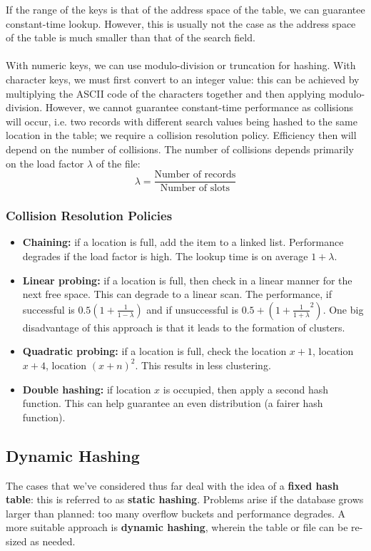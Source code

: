 \documentclass[a4paper,11pt]{article}
\begin{document}
If the range of the keys is that of the address space of the table, we can guarantee constant-time lookup.
However, this is usually not the case as the address space of the table is much smaller than that of the search field.
\\\\
With numeric keys, we can use modulo-division or truncation for hashing.
With character keys, we must first convert to an integer value: this can be achieved by multiplying the ASCII 
code of the characters together and then applying modulo-division.
However, we cannot guarantee constant-time performance as collisions will occur, i.e. two records with different search
values being hashed to the same location in the table; we require a collision resolution policy.
Efficiency then will depend on the number of collisions. 
The number of collisions depends primarily on the load factor $\lambda$ of the file: 
$$
\lambda =  \frac{\text{Number of records}}{\text{Number of slots}}
$$

\subsubsection{Collision Resolution Policies}
\begin{itemize}
    \item   \textbf{Chaining:} if a location is full, add the item to a linked list. 
            Performance degrades if the load factor is high.
            The lookup time is on average $1 + \lambda$.
    \item   \textbf{Linear probing:} if a location is full, then check in a linear manner for the next free space. 
            This can degrade to a linear scan. 
            The performance, if successful is $0.5(1 + \frac{1}{1-\lambda})$ and if unsuccessful is
            $0.5 + (1 + \frac{1}{1 + \lambda}^2)$.
            One big disadvantage of this approach is that it leads to the formation of clusters.
    \item   \textbf{Quadratic probing:} if a location is full, check the location $x + 1$, location $x + 4$, 
            location $(x + n)^2$.
            This results in less clustering.
    \item   \textbf{Double hashing:} if location $x$ is occupied, then apply a second hash function. 
            This can help guarantee an even distribution (a fairer hash function).
\end{itemize}

\subsection{Dynamic Hashing}
The cases that we've considered thus far deal with the idea of a \textbf{fixed hash table}: this is referred to 
as \textbf{static hashing}.
Problems arise if the database grows larger than planned: too many overflow buckets and performance degrades.
A more suitable approach is \textbf{dynamic hashing}, wherein the table or file can be re-sized as needed.
\end{document}
